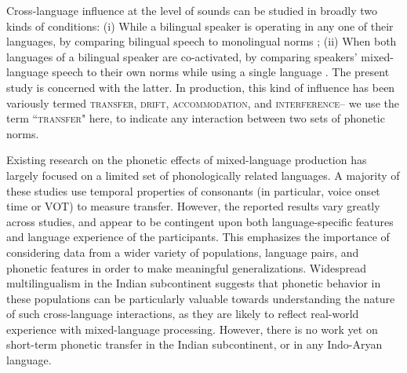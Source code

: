 \documentclass[12 pt]{article}
\begin{document}
Cross-language influence at the level of sounds can be studied in broadly two kinds of conditions:
(i) While a bilingual speaker is operating in any one of their languages, by comparing bilingual speech to monolingual norms \citep[e.g.][]{guion2003vowel,caramazza1973acquisition,flege1987production}; %
(ii) When both languages of a bilingual speaker are co-activated, by comparing speakers' mixed-language speech to their own norms while using a single language \citep[e.g.][]{grosjean1994going, bullock2009trying,elias2017effects, simonet2014phonetic}. %
The present study is concerned with the latter. In production, this kind of influence has been variously termed \textsc{transfer, drift, accommodation,} and \textsc{interference}-- we use the term \textsc{``transfer"} here, to indicate any interaction between two sets of phonetic norms.

Existing research on the phonetic effects of mixed-language production has largely focused on a limited set of phonologically related languages. A majority of these studies use temporal properties of consonants (in particular, voice onset time or VOT) to measure transfer. However, the reported results vary greatly across studies, and appear to be contingent upon both language-specific features and language experience of the participants. This emphasizes the importance of considering data from a wider variety of
populations, language pairs,  and phonetic features in order to make meaningful generalizations. Widespread multilingualism in the Indian subcontinent suggests that phonetic
behavior in these populations can be particularly valuable towards understanding the nature of such cross-language interactions, as they are likely to reflect real-world experience with mixed-language processing. However, there is no work yet on short-term phonetic transfer in the Indian subcontinent, or in any Indo-Aryan language. 
\end{document}
